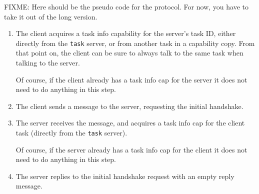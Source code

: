 FIXME: Here should be the pseudo code for the protocol.  For now, you
have to take it out of the long version.

\begin{enumerate}
  
\item The client acquires a task info capability for the server's task
  ID, either directly from the \texttt{task} server, or from another
  task in a capability copy.  From that point on, the client can be
  sure to always talk to the same task when talking to the server.
  
  Of course, if the client already has a task info cap for the server
  it does not need to do anything in this step.

\begin{comment}
  As explained above, if the client does not have any other task
  holding the task info cap already, it has no secure information
  about what this task is for which it got a task info cap.
\end{comment}

\item The client sends a message to the server, requesting the initial
  handshake.
  
\item The server receives the message, and acquires a task info cap
  for the client task (directly from the \texttt{task} server).
  
  Of course, if the server already has a task info cap for the client
  it does not need to do anything in this step.

\begin{comment}
  At this point, the server knows that future messages from this task
  will come from the same task as it got the task info cap for.
  However, it does not know that this is the same task that sent the
  initial handshake request in step 2 above.  This shows that there is
  no sense in verifying the task ID or perform any other
  authentication before acquiring the task info cap.
\end{comment}

\item The server replies to the initial handshake request with an
  empty reply message.

\begin{comment}
  Because the reply now can go to a different task than the request
  came from, sending the reply might fail.  It might also succeed and
  be accepted by the task that replaced the requestor.  Or it might
  succeed normally.  The important thing is that it does not matter to
  the server at all.  It would have provided the same ``service'' to
  the ``imposter'' of the client, if he had bothered to do the
  request.  As no authentication is done yet, there is no point for
  the server to bother.
  

\end{comment}
\end{enumerate}
